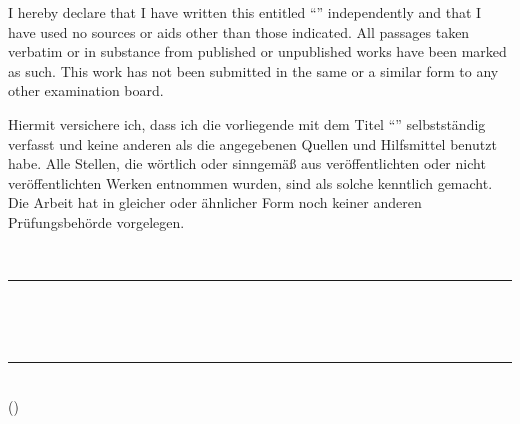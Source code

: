 \thispagestyle{plain}

\ifIEnglish
  I hereby declare that I have written this \IreportKindName{} entitled
  \enquote{\Iinline{\IreportTitle}} independently and that I have used no sources
  or aids other than those indicated. All passages taken verbatim or in substance
  from published or unpublished works have been marked as such. This work has not
  been submitted in the same or a similar form to any other examination board.

  \ifIAIStatement
  \fi
\else
  Hiermit versichere ich, dass ich die vorliegende \IreportKindName{} mit dem Titel
  \enquote{\Iinline{\IreportTitle}} selbstständig verfasst und keine anderen als die
  angegebenen Quellen und Hilfsmittel benutzt habe. Alle Stellen, die wörtlich oder
  sinngemäß aus veröffentlichten oder nicht veröffentlichten Werken entnommen wurden,
  sind als solche kenntlich gemacht. Die Arbeit hat in gleicher oder ähnlicher Form
  noch keiner anderen Prüfungsbehörde vorgelegen.

  \ifIAIStatement
  \fi
\fi

\vspace{25mm}

\noindent
\begin{minipage}[b]{0.42\textwidth}
  \centering
  \IsubmissionPlace\ifdefempty{\IsubmissionDate}{}{, \IsubmissionDate}\\[-0.8ex]
  \rule{\linewidth}{0.4pt}\\
  {\footnotesize {}}
\end{minipage}%
\hfill
\begin{minipage}[b]{0.48\textwidth}
  \centering
  \mbox{}\\[-0.8ex]
  \rule{\linewidth}{0.4pt}\\
  {\footnotesize {}\quad(\IreportAuthor)}
\end{minipage}
